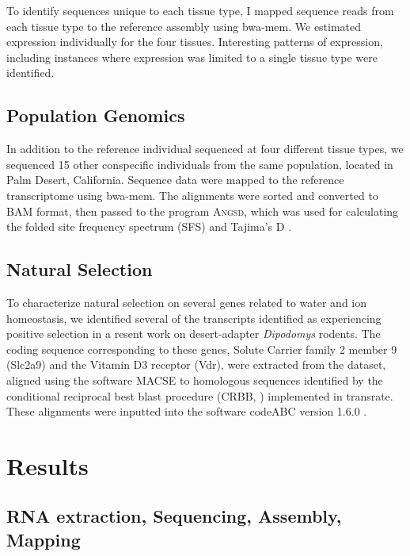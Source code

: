 \documentclass[11pt]{article}
\begin{document}
To identify sequences unique to each tissue type, I mapped sequence reads from each tissue type to the reference assembly using bwa-mem. We estimated expression individually for the four tissues. Interesting patterns of expression, including instances where expression was limited to a single tissue type were identified. \\ 

\subsection*{Population Genomics}

In addition to the reference individual sequenced at four different tissue types, we sequenced 15 other conspecific individuals from the same population, located in Palm Desert, California. Sequence data were mapped to the reference transcriptome using bwa-mem. The alignments were sorted and converted to BAM format, then passed to the program \textsc{Angsd}, which was used for calculating the folded site frequency spectrum (SFS) and Tajima's D \cite{Korneliussen:2013uz}. \\


\subsection*{Natural Selection}

To characterize natural selection on several genes related to water and ion homeostasis, we identified several of the transcripts identified as experiencing positive selection in a resent work on desert-adapter \textit{Dipodomys} rodents. The coding sequence corresponding to these genes, Solute Carrier family 2 member 9  (Slc2a9) and the Vitamin D3 receptor (Vdr), were extracted from the dataset, aligned using the software MACSE \cite{Ranwez:2011kj} to homologous sequences identified by the conditional reciprocal best blast procedure (CRBB, \cite{Aubry:2014en}) implemented in transrate. These alignments were inputted into the software codeABC version 1.6.0 \cite{Lopes:2013fd}.    


\section*{Results}

\subsection*{RNA extraction, Sequencing, Assembly, Mapping}
\end{document}
